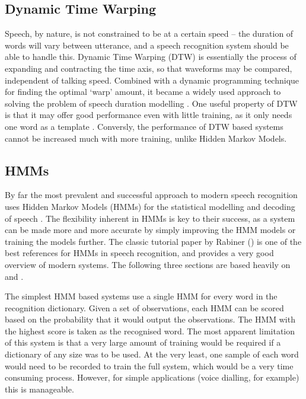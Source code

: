 \subsection{Dynamic Time Warping} %
\label{sub:dynamic_time_warping}
Speech, by nature, is not constrained to be at a certain speed -- the duration of words will vary between utterance, and a speech recognition system should be able to handle this.  Dynamic Time Warping (DTW) is essentially the process of expanding and contracting the time axis, so that waveforms may be compared, independent of talking speed.  Combined with a dynamic programming technique for finding the optimal `warp' amount, it became a widely used approach to solving the problem of speech duration modelling \cite{furui1989speech}.  One useful property of DTW is that it may offer good performance even with little training, as it only needs one word as a template \cite{melnikoff2003speech}.  Conversly, the performance of DTW based systems cannot be increased much with more training, unlike Hidden Markov Models.

\subsection{HMMs} %
\label{sub:about_hmms}
By far the most prevalent and successful approach to modern speech recognition uses Hidden Markov Models (HMMs) for the statistical modelling and decoding of speech \cite{cox1988hidden}.  The flexibility inherent in HMMs is key to their success, as a system can be made more and more accurate by simply improving the HMM models or training the models further.  The classic tutorial paper by Rabiner (\cite{rabiner1989tutorial}) is one of the best references for HMMs in speech recognition, and provides a very good overview of modern systems.  The following three sections are based heavily on \cite{rabiner1989tutorial} and \cite{htkbook}.

The simplest HMM based systems use a single HMM for every word in the recognition dictionary.  Given a set of observations, each HMM can be scored based on the probability that it would output the observations.  The HMM with the highest score is taken as the recognised word.  The most apparent limitation of this system is that a very large amount of training would be required if a dictionary of any size was to be used.  At the very least, one sample of each word would need to be recorded to train the full system, which would be a very time consuming process.  However, for simple applications (voice dialling, for example) this is manageable.

